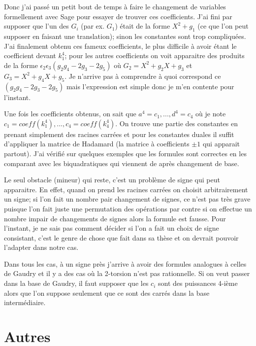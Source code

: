 \documentclass[a4paper]{article}
\theoremstyle{definition}
\theoremstyle{remark}
\numberwithin{equation}{section}
\begin{document}
Donc j'ai passé un petit bout de temps à faire le changement de variables formellement avec Sage pour essayer de trouver ces coefficients. J'ai fini par supposer que l'un des $G_i$ (par ex. $G_1$) était de la forme $X^2 + g_1$ (ce que l'on peut supposer en faisant une translation); sinon les constantes sont trop compliquées. J'ai finalement obtenu ces fameux coefficients, le plus difficile à avoir étant le coefficient devant $k_1^4$; pour les autres coefficients on voit apparaitre des produits de la forme $\epsilon_2\epsilon_3(g_2g_4 - 2g_3 - 2g_5)$ où $G_2 = X^2+g_2X+g_3$ et $G_3 = X^2+g_4X+g_5$. Je n'arrive pas à comprendre à quoi correspond ce $(g_2g_4 - 2g_3 - 2g_5)$ mais l'expression est simple donc je m'en contente pour l'instant.

Une fois les coefficients obtenus, on sait que $a^4 = c_1, ... , d^4 = c_4$ où je note $c_1 = coeff(k_1^4), ..., c_4 = coeff(k_4^4)$.
On trouve une partie des constantes en prenant simplement des racines carrées et pour les constantes duales il suffit d'appliquer la matrice de Hadamard (la matrice à coefficients $\pm 1$ qui apparait partout).
J'ai vérifié sur quelques exemples que les formules sont correctes en les comparant avec les biquadratiques qui viennent de \citep{cassels-Flynn} après changement de base.

Le seul obstacle (mineur) qui reste, c'est un problème de signe qui peut apparaitre. En effet, quand on prend les racines carrées on choisit arbitrairement un signe; si l'on fait un nombre pair changement de signes, ce n'est pas très grave puisque l'on fait juste une permutation des opérations par contre si on effectue un nombre impair de changements de signes alors la formule est fausse. Pour l'instant, je ne sais pas comment décider si l'on a fait un choix de signe consistant, c'est le genre de chose que fait \citet{cosset} dans sa thèse et on devrait pouvoir l'adapter dans notre cas.

Dans tous les cas, à un signe près j'arrive à avoir des formules analogues à celles de Gaudry et il y a des cas où la 2-torsion n'est pas rationnelle. Si on veut passer dans la base de Gaudry, il faut supposer que les $c_i$ sont des puissances 4-ième alors que l'on suppose seulement que ce sont des carrés dans la base intermédiaire.

\section{Autres}
\end{document}
